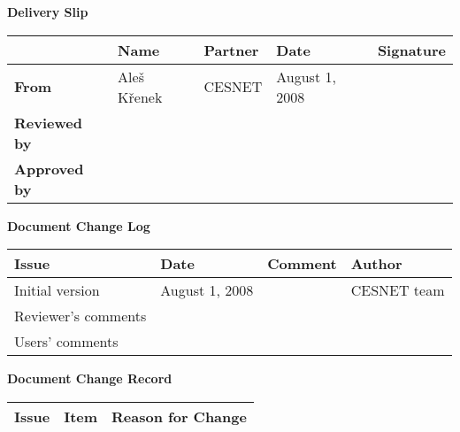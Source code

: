 %
%
\begin{center}
{\bf Delivery Slip}
\end{center}
\begin{tabularx}{\textwidth}{|l|l|l|X|X|}
\hline
           & {\bf Name} & {\bf Partner} & {\bf Date} & {\bf Signature} \\
\hline
{\bf From} & Ale\v{s} K\v{r}enek & CESNET & August 1, 2008 & \\
\hline
{\bf Reviewed by} & &  & & \\

\hline
{\bf Approved by} & & & & \\
\hline
\end{tabularx}

\begin{center}
{\bf Document Change Log}
\end{center}

\begin{tabularx}{\textwidth}{|l|l|X|X|}
\hline
{\bf Issue } & {\bf Date  } & {\bf Comment } & {\bf Author  } \\   \hline
Initial version & August 1, 2008 & & CESNET team \\ \hline
Reviewer's comments &&& \\ \hline
Users' comments &&& \\ 

\hline
\end{tabularx}

\begin{center}
{\bf Document Change Record}
\end{center}

\begin{tabularx}{\textwidth}{|l|l|X|}
\hline
{\bf Issue } & {\bf Item  } & {\bf Reason for Change } \\   \hline

\hline
\end{tabularx}


\clearpage
